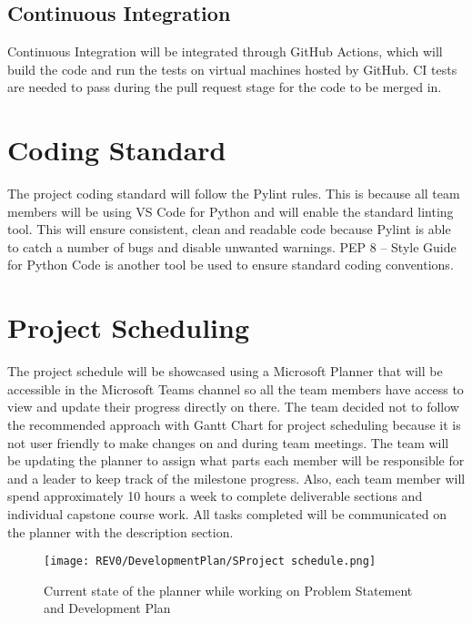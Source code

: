 \documentclass{article}
\begin{document}
\subsection{Continuous Integration}
Continuous Integration will be integrated through GitHub Actions, which will build the code and run the tests on virtual machines hosted by GitHub. CI tests are needed to pass during the pull request stage for the code to be merged in.


\section{Coding Standard}
The project coding standard will follow the Pylint rules. This is because all team members will be using VS Code for Python and will enable the standard linting tool. This will ensure consistent, clean and readable code because Pylint is able to catch a number of bugs and disable unwanted warnings. %
PEP 8 – Style Guide for Python Code is another tool be used to ensure standard coding conventions. %

\section{Project Scheduling} %
The project schedule will be showcased using a Microsoft Planner that will be accessible in the Microsoft Teams channel so all the team members have access to view and update their progress directly on there. The team decided not to follow the recommended approach with Gantt Chart for project scheduling because it is not user friendly to make changes on and during team meetings. The team will be updating the planner to assign what parts each member will be responsible for and a leader to keep track of the milestone progress. Also, each team member will spend approximately 10 hours a week to complete deliverable sections and individual capstone course work. All tasks completed will be communicated on the planner with the description section.
\begin{figure}[h]
\caption{Current state of the planner while working on Problem Statement and Development Plan}
\centering
\texttt{[image: REV0/DevelopmentPlan/SProject schedule.png]}
\end{figure}
\end{document}
